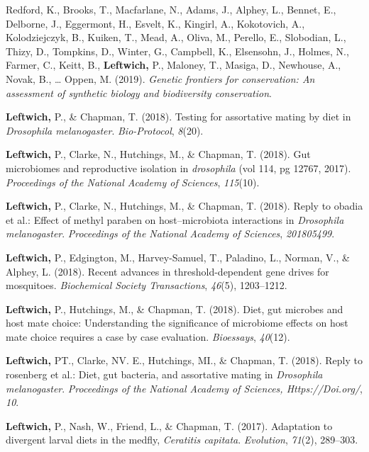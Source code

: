 \documentclass[11pt, a4paper]{awesome-cv}
\begin{document}
\leavevmode\hypertarget{ref-6}{}%
Redford, K., Brooks, T., Macfarlane, N., Adams, J., Alphey, L., Bennet,
E., Delborne, J., Eggermont, H., Esvelt, K., Kingirl, A., Kokotovich,
A., Kolodziejczyk, B., Kuiken, T., Mead, A., Oliva, M., Perello, E.,
Slobodian, L., Thizy, D., Tompkins, D., Winter, G., Campbell, K.,
Elsensohn, J., Holmes, N., Farmer, C., Keitt, B., \textbf{Leftwich,} P.,
Maloney, T., Masiga, D., Newhouse, A., Novak, B., \ldots{} Oppen, M.
(2019). \emph{Genetic frontiers for conservation: An assessment of
synthetic biology and biodiversity conservation}.

\leavevmode\hypertarget{ref-17}{}%
\textbf{Leftwich,} P., \& Chapman, T. (2018). Testing for assortative
mating by diet in \emph{{Drosophila} melanogaster}. \emph{Bio-Protocol},
\emph{8}(20).

\leavevmode\hypertarget{ref-3}{}%
\textbf{Leftwich,} P., Clarke, N., Hutchings, M., \& Chapman, T. (2018).
Gut microbiomes and reproductive isolation in \emph{drosophila} (vol
114, pg 12767, 2017). \emph{Proceedings of the National Academy of
Sciences}, \emph{115}(10).

\leavevmode\hypertarget{ref-10}{}%
\textbf{Leftwich,} P., Clarke, N., Hutchings, M., \& Chapman, T. (2018).
Reply to obadia et al.: Effect of methyl paraben on host--microbiota
interactions in \emph{{Drosophila} melanogaster}. \emph{Proceedings of
the National Academy of Sciences}, \emph{201805499}.

\leavevmode\hypertarget{ref-5}{}%
\textbf{Leftwich,} P., Edgington, M., Harvey-Samuel, T., Paladino, L.,
Norman, V., \& Alphey, L. (2018). Recent advances in threshold-dependent
gene drives for mosquitoes. \emph{Biochemical Society Transactions},
\emph{46}(5), 1203--1212.

\leavevmode\hypertarget{ref-12}{}%
\textbf{Leftwich,} P., Hutchings, M., \& Chapman, T. (2018). Diet, gut
microbes and host mate choice: Understanding the significance of
microbiome effects on host mate choice requires a case by case
evaluation. \emph{Bioessays}, \emph{40}(12).

\leavevmode\hypertarget{ref-8}{}%
\textbf{Leftwich,} PT., Clarke, NV. E., Hutchings, MI., \& Chapman, T.
(2018). Reply to rosenberg et al.: Diet, gut bacteria, and assortative
mating in \emph{{Drosophila} melanogaster}. \emph{Proceedings of the
National Academy of Sciences, Https://Doi.org/}, \emph{10}.

\leavevmode\hypertarget{ref-9}{}%
\textbf{Leftwich,} P., Nash, W., Friend, L., \& Chapman, T. (2017).
Adaptation to divergent larval diets in the medfly, \emph{{Ceratitis}
capitata}. \emph{Evolution}, \emph{71}(2), 289--303.
\end{document}
